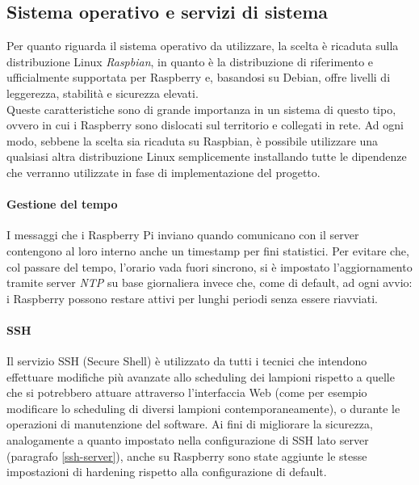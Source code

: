 \subsection{Sistema operativo e servizi di sistema}
Per quanto riguarda il sistema operativo da utilizzare, la scelta è ricaduta sulla distribuzione Linux \textit{Raspbian}, in quanto è la distribuzione di riferimento e ufficialmente supportata per Raspberry e, basandosi su Debian, offre livelli di leggerezza, stabilità e sicurezza elevati.
\\Queste caratteristiche sono di grande importanza in un sistema di questo tipo, ovvero in cui i Raspberry sono dislocati sul territorio e collegati in rete.
Ad ogni modo, sebbene la scelta sia ricaduta su Raspbian, è possibile utilizzare una qualsiasi altra distribuzione Linux semplicemente installando tutte le dipendenze che verranno utilizzate in fase di implementazione del progetto.
\paragraph{Gestione del tempo}
I messaggi che i Raspberry Pi inviano quando comunicano con il server contengono al loro interno anche un timestamp per fini statistici.
Per evitare che, col passare del tempo, l'orario vada fuori sincrono, si è impostato l'aggiornamento tramite server \textit{NTP} su base giornaliera invece che, come di default, ad ogni avvio: i Raspberry possono restare attivi per lunghi periodi senza essere riavviati.
\paragraph{SSH}
Il servizio SSH (Secure Shell) è utilizzato da tutti i tecnici che intendono effettuare modifiche più avanzate allo scheduling dei lampioni rispetto a quelle che si potrebbero attuare attraverso l'interfaccia Web (come per esempio modificare lo scheduling di diversi lampioni contemporaneamente), o durante le operazioni di manutenzione del software.
Ai fini di migliorare la sicurezza, analogamente a quanto impostato nella configurazione di SSH lato server (paragrafo \ref{ssh-server}), anche su Raspberry sono state aggiunte le stesse impostazioni di hardening rispetto alla configurazione di default.

